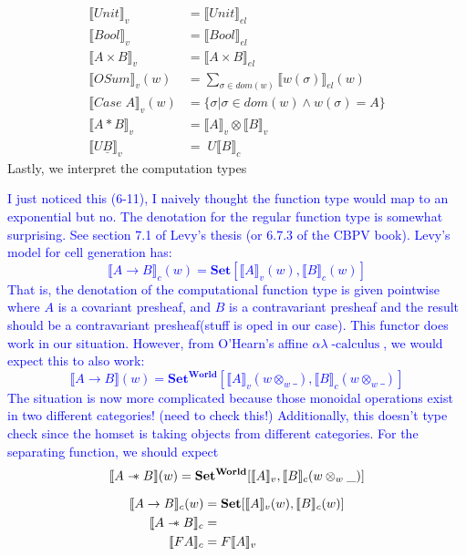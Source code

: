 \documentclass{article}
\newcommand{\den}[1]{\llbracket #1 \rrbracket}
\newcommand{\blue}[1]{\textcolor{blue}{#1}}
\newcommand{\sep}{\mathrel{-\mkern-6mu*}}
\newcommand{\world}{{\mathbf{World}}}
\newcommand{\calculus}{\operatorname{-calculus}}
\begin{document}
\begin{align*}
    \llbracket Unit \rrbracket_v &= \llbracket Unit \rrbracket_{el}\\
    \llbracket Bool \rrbracket_v &= \llbracket Bool \rrbracket_{el}\\
    \llbracket A \times B \rrbracket_v &= \llbracket A \times B \rrbracket_{el}\\
    \llbracket OSum \rrbracket_v (w)&= \sum_{\sigma \in dom(w)} \llbracket w(\sigma) \rrbracket_{el}(w)\\
    \llbracket Case \; A \rrbracket_v(w) &= \{ \sigma | \sigma \in dom(w) \land w(\sigma)= A \} \\
    \llbracket A * B \rrbracket_v &= \llbracket A \rrbracket_v \otimes \llbracket B \rrbracket_v \\
    \llbracket U  \underline{B} \rrbracket_v &= \; U \llbracket B \rrbracket_c 
\end{align*}
Lastly, we interpret the computation types


\blue{
I just noticed this (6-11), I naively thought the function type would map to an exponential but no.
The denotation for the regular function type is somewhat surprising. 
See section 7.1 of Levy's thesis (or 6.7.3 of the CBPV book). Levy's model for cell generation has:
\[
    \den{A \rightarrow B}_c(w)= \mathbf{Set} [ \den{A}_v(w) , \den{B}_c(w) ]
\]
That is, the denotation of the computational function type is given pointwise where $A$ is a covariant presheaf, and $B$ is a
contravariant presheaf and the result should be a contravariant presheaf(stuff is oped in our case). 
This functor does work in our situation. However, from O'Hearn's affine $\alpha\lambda\calculus$, we would expect this to also work:
\[
    \den{A \rightarrow B}(w)= \mathbf{Set^{\world}}[ \den{A}_v(w \otimes_w \_) , \den{B}_c(w \otimes_w \_)]
\]
The situation is now more complicated because those monoidal operations exist in two different categories!
(need to check this!) Additionally, this doesn't type check since the homset is taking objects from different categories.
For the separating function, we should expect
\[
    \den{A \sep B}(w)= \mathbf{Set^{\world}}[ \den{A}_v , \den{B}_c(w \otimes_w \_)]
\]
}


\begin{align*}
    \llbracket A \rightarrow B \rrbracket_c(w) &= \mathbf{Set}[ \den{A}_v(w) , \den{B}_c(w) ]\\
    \llbracket A \sep B \rrbracket_c &= \\
    \llbracket F A \rrbracket_c &= F\llbracket A \rrbracket_v\\
\end{align*}
\end{document}

